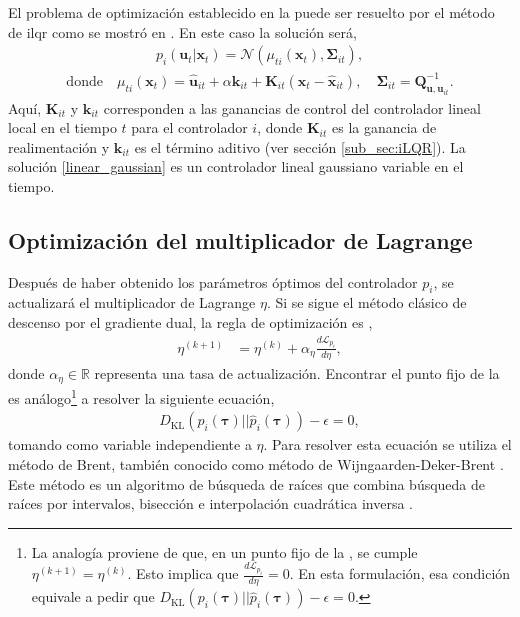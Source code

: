 El problema de optimización establecido en la  puede ser resuelto por el método de \acrshort{ilqr} como se mostró en \cite{2014-mfcgps}. En este caso la solución será, 
\begin{align}
p_i(\mathbf{u}_t|\mathbf{x}_t) = \mathcal{N}\left( \mu_{ti}(\mathbf{x}_t), \mathbf{\Sigma}_{it}\right), \label{linear_gaussian}
\end{align}
\begin{align}
\text{donde} \quad 
\mu_{ti}(\mathbf{x}_t) = \hat{\mathbf{u}}_{it} + \alpha \mathbf{k}_{it} +  \mathbf{K}_{it} \left(\mathbf{x}_{t} - \hat{\mathbf{x}}_{it}\right), \quad
\mathbf{\Sigma}_{it} = \mathbf{Q}_{\mathbf{u, u}_{it}}^{-1}.
\end{align}
Aquí, $\mathbf{K}_{it}$ y $\mathbf{k}_{it}$ corresponden a las ganancias de control del controlador lineal local en el tiempo $t$ para el controlador $i$, donde $\mathbf{K}_{it}$ es la ganancia de realimentación y $\mathbf{k}_{it}$ es el término aditivo (ver sección \ref{sub_sec:iLQR}). La solución \ref{linear_gaussian} es un controlador lineal gaussiano variable en el tiempo.
\subsection{Optimización del multiplicador de Lagrange}
Después de haber obtenido los parámetros óptimos del controlador $p_i$, se actualizará el multiplicador de Lagrange $\eta$. Si se sigue el método clásico de descenso por el gradiente dual, la regla de optimización es \cite{michaelrzhang-gps}, 
\begin{align}
    \eta^{(k+1)} &= \eta^{(k)} + \alpha_{\eta}\frac{d\mathcal{L}_{p_i}}{d\eta},
    \label{eq:DGD_2}
\end{align}
donde $\alpha_{\eta}\in \mathbb{R}$ representa una tasa de actualización. Encontrar el punto fijo de la  es análogo\footnote{La analogía proviene de que, en un punto fijo de la , se cumple $\eta^{(k+1)}=\eta^{(k)}$. Esto implica que $\frac{d\mathcal{L}_{p_i}}{d\eta}=0$. En esta formulación, esa condición equivale a pedir que $D_{\text{KL}}(p_i(\bm\tau)||\hat{p}_i(\bm\tau)) - \epsilon = 0$.} a resolver la siguiente ecuación, 
\begin{align}
    D_{\text{KL}}(p_i(\bm\tau)||\hat{p}_i(\bm\tau)) - \epsilon = 0, 
    \label{eq:brent_eq}
\end{align}
tomando como variable independiente a $\eta$. Para resolver esta ecuación se utiliza el método de Brent, también conocido como método de Wijngaarden-Deker-Brent \cite{Brent1973}. Este método es un algoritmo de búsqueda de raíces que combina búsqueda de raíces por intervalos, bisección e interpolación cuadrática inversa \cite{MathWorldBrentsMethod}. 

